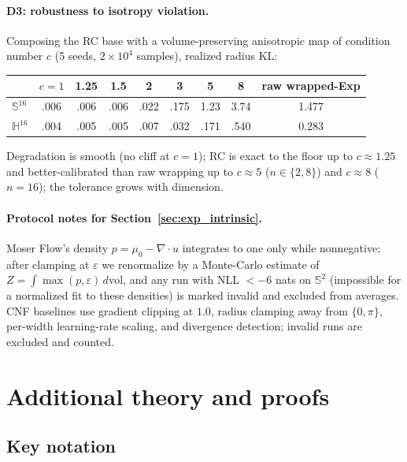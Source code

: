 \documentclass{article}
\theoremstyle{definition}
\theoremstyle{remark}
\newcommand{\SSS}{\mathbb{S}}
\newcommand{\HH}{\mathbb{H}}
\begin{document}
\paragraph{D3: robustness to isotropy violation.} Composing the RC base with a volume-preserving anisotropic map of condition number $c$ (5 seeds, $2\times10^4$ samples), realized radius KL:
\begin{center}\small
\begin{tabular}{lcccccccc}
\toprule
 & $c{=}1$ & 1.25 & 1.5 & 2 & 3 & 5 & 8 & raw wrapped-Exp\\
\midrule
$\SSS^{16}$ & .006 & .006 & .006 & .022 & .175 & 1.23 & 3.74 & 1.477\\
$\HH^{16}$ & .004 & .005 & .005 & .007 & .032 & .171 & .540 & 0.283\\
\bottomrule
\end{tabular}
\end{center}
Degradation is smooth (no cliff at $c{=}1$); RC is exact to the floor up to $c\approx1.25$ and better-calibrated than raw wrapping up to $c\approx5$ ($n\in\{2,8\}$) and $c\approx8$ ($n{=}16$); the tolerance grows with dimension.

\paragraph{Protocol notes for Section~\ref{sec:exp_intrinsic}.} Moser Flow's density $p=\mu_0-\nabla\!\cdot u$ integrates to one only while nonnegative; after clamping at $\varepsilon$ we renormalize by a Monte-Carlo estimate of $Z=\int\max(p,\varepsilon)\,d\mathrm{vol}$, and any run with NLL $<-6$ nats on $\SSS^2$ (impossible for a normalized fit to these densities) is marked invalid and excluded from averages. CNF baselines use gradient clipping at $1.0$, radius clamping away from $\{0,\pi\}$, per-width learning-rate scaling, and divergence detection; invalid runs are excluded and counted.


\section{Additional theory and proofs}
\label{app:proofs}

\subsection{Key notation}
\label{app:notation}
\end{document}
